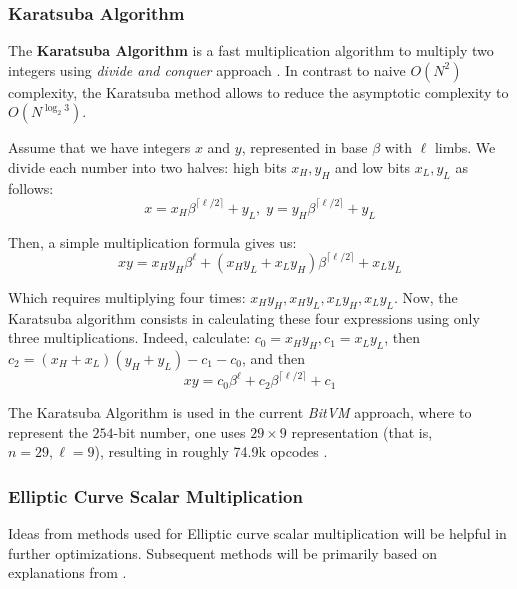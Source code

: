 \documentclass{iacrtrans}
\begin{document}

\subsubsection{Karatsuba Algorithm}\label{section:karatsuba}

The \textbf{Karatsuba Algorithm} is a fast multiplication algorithm to multiply two integers using \textit{divide and conquer} approach \cite{karatsuba}. In contrast to naive $O(N^2)$ complexity, the Karatsuba method allows to reduce the asymptotic complexity to $O(N^{\log_2 3})$. 

Assume that we have integers $x$ and $y$, represented in base $\beta$ with $\ell$ limbs. We divide each number into two halves: high bits $x_H,y_H$ and low bits $x_L,y_L$ as follows:
\begin{equation}
    x = x_H\beta^{\lceil\ell/2\rceil} + y_L, \; y = y_H\beta^{\lceil\ell/2\rceil} + y_L
\end{equation}

Then, a simple multiplication formula gives us:
\begin{equation}
    xy = x_Hy_H\beta^{\ell} + (x_Hy_L + x_Ly_H)\beta^{\lceil\ell/2\rceil} + x_Ly_L
\end{equation}

Which requires multiplying four times: $x_Hy_H,x_Hy_L,x_Ly_H,x_Ly_L$. Now, the Karatsuba algorithm consists in calculating these four expressions using only three multiplications. Indeed, calculate: $c_0 = x_Hy_H, c_1 = x_Ly_L$, then $c_2 = (x_H+x_L)(y_H+y_L)-c_1-c_0$, and then
\begin{equation}
    xy = c_0\beta^{\ell} + c_2\beta^{\lceil\ell/2\rceil} + c_1
\end{equation}

The Karatsuba Algorithm is used in the current \textit{BitVM} approach, where to represent the $254$-bit number, one uses $29\times 9$ representation (that is, $n=29,\ell=9$), resulting in roughly \textsf{74.9k} opcodes \cite{bitvm}.


\subsubsection{Elliptic Curve Scalar Multiplication}

Ideas from methods used for Elliptic curve scalar multiplication will be helpful in further optimizations. Subsequent methods will be primarily based on explanations from \cite{guide_ec}.
\end{document}
